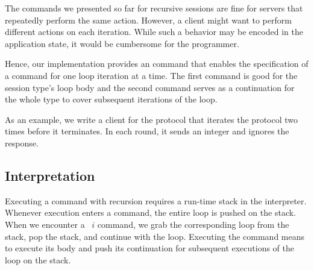 \documentclass[acmsmall,screen]{acmart}
\begin{document}
The commands we presented so far for recursive sessions are fine for
servers that repeatedly perform the same action. However, a client
might want to perform different actions on each iteration. While such
a behavior may be encoded in the application state, it would be cumbersome for the programmer.

Hence, our implementation provides an {\AUNROLL} command that
enables the specification of a command for one loop iteration at a time.
\rstCommandUNROLL
The first command is good for the session type's loop body and the
second command serves as a continuation for the whole type to cover subsequent
iterations of the loop. 

As an example, we write a client for the {\Amanyunaryp} protocol that
iterates the protocol two times before it terminates. In each round,
it sends an integer and ignores the response.
\rstClientExample

\subsection{Interpretation}
\label{sec:interpretaion}


Executing a command with recursion requires a run-time stack in the
interpreter. Whenever execution enters a {\AMU} command, the entire
loop is pushed on the stack. When we encounter a {\ACONTINUE~$i$}
command, we grab the corresponding loop from the stack, pop the stack, and
continue with the loop.
Executing the {\AUNROLL} command means to execute its body and push its
continuation for subsequent executions of the loop on the stack.
\end{document}
